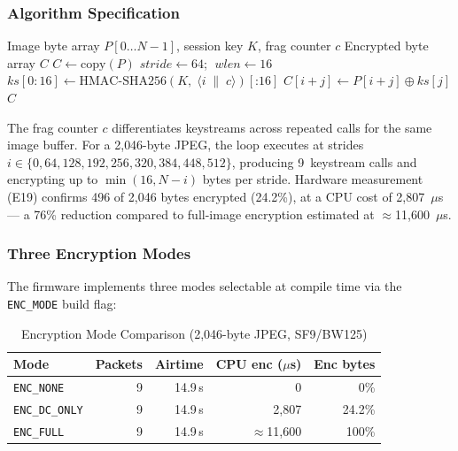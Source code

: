 \documentclass[journal]{IEEEtran}
\begin{document}
\subsubsection{Algorithm Specification}

\begin{algorithm}[H]
\caption{Stride-Based Selective Encryption (\texttt{ENC\_DC\_ONLY} mode)}
\label{alg:sel_enc}
\begin{algorithmic}[1]
\Require Image byte array $P[0 \ldots N{-}1]$, session key $K$, frag counter $c$
\Ensure Encrypted byte array $C$
\State $C \leftarrow \text{copy}(P)$
\State $\mathit{stride} \leftarrow 64$; $\;\mathit{wlen} \leftarrow 16$
  \State $\mathit{ks}[0{:}16] \leftarrow \mathrm{HMAC\text{-}SHA256}(K,\;
         \langle i \;\|\; c \rangle)[\text{:}16]$
    \State $C[i+j] \leftarrow P[i+j] \oplus \mathit{ks}[j]$
  \EndFor
\EndFor
\State \Return $C$
\end{algorithmic}
\end{algorithm}

The frag counter $c$ differentiates keystreams across repeated calls for the
same image buffer.  For a 2{,}046-byte JPEG, the loop executes at strides
$i \in \{0, 64, 128, 192, 256, 320, 384, 448, 512\}$, producing 9~keystream
calls and encrypting up to $\min(16, N-i)$ bytes per stride.
Hardware measurement (E19) confirms 496 of 2{,}046 bytes encrypted (24.2\%),
at a CPU cost of 2{,}807~$\mu$s --- a 76\% reduction compared to full-image
encryption estimated at $\approx$11{,}600~$\mu$s.

\subsubsection{Three Encryption Modes}

The firmware implements three modes selectable at compile time via the
\texttt{ENC\_MODE} build flag:

\begin{table}[ht]
\centering
\caption{Encryption Mode Comparison (2{,}046-byte JPEG, SF9/BW125)}
\label{tab:enc_modes}
\begin{tabular}{lrrrr}
\toprule
Mode & Packets & Airtime & CPU enc ($\mu$s) & Enc bytes \\
\midrule
\texttt{ENC\_NONE}    & 9 & 14.9\,s & 0         & 0\% \\
\texttt{ENC\_DC\_ONLY}& 9 & 14.9\,s & 2{,}807   & 24.2\% \\
\texttt{ENC\_FULL}    & 9 & 14.9\,s & $\approx$11{,}600 & 100\% \\
\bottomrule
\end{tabular}
\end{table}
\end{document}

